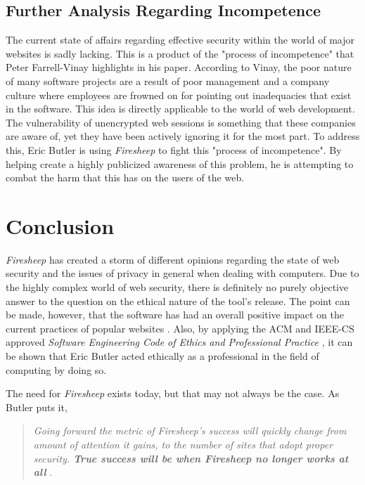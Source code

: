 \documentclass[11pt]{article}
\begin{document}
\begin{multicols}{2}
\subsection{Further Analysis Regarding Incompetence}
The current state of affairs regarding effective security within the world of major websites is sadly lacking. This is a product of the "process of incompetence" that Peter Farrell-Vinay \cite{incompetence} highlights in his paper. According to Vinay, the poor nature of many software projects are a result of poor management and a company culture where employees are frowned on for pointing out inadequacies that exist in the software. This idea is directly applicable to the world of web development. The vulnerability of unencrypted web sessions is something that these companies are aware of, yet they have been actively ignoring it for the most part. To address this, Eric Butler is using \emph{Firesheep} to fight this "process of incompetence". By helping create a highly publicized awareness of this problem, he is attempting to combat the harm that this has on the users of the web.

\section{Conclusion}
\emph{Firesheep} has created a storm of different opinions regarding the state of web security and the issues of privacy in general when dealing with computers. Due to the highly complex world of web security, there is definitely no purely objective answer to the question on the ethical nature of the tool's release. The point can be made, however, that the software has had an overall positive impact on the current practices of popular websites \cite{github_reaction} \cite{facebook_reaction} \cite{twitter_reaction}. Also, by applying the ACM and IEEE-CS approved \emph{Software Engineering Code of Ethics and Professional Practice} \cite{se_code}, it can be shown that Eric Butler acted ethically as a professional in the field of computing by doing so.

The need for \emph{Firesheep} exists today, but that may not always be the case. As Butler puts it,

\begin{quote}
  \emph{Going forward the metric of Firesheep’s success will quickly change from amount of attention it gains, to the number of sites that adopt proper security. \textbf{True success will be when Firesheep no longer works at all}} \cite{codebutler_blog_2}.
\end{quote}


\end{multicols}
\end{document}
